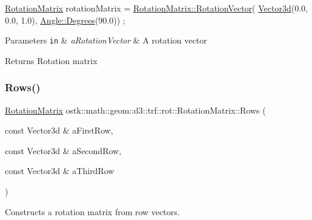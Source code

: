 \begin{DoxyCode}
\hyperlink{classostk_1_1math_1_1geom_1_1d3_1_1trf_1_1rot_1_1_rotation_matrix_a5e6bed0779ad7db0c5bf26b2bd96f8ba}{RotationMatrix} rotationMatrix = \hyperlink{classostk_1_1math_1_1geom_1_1d3_1_1trf_1_1rot_1_1_rotation_matrix_a609da1b600078c74a84bcac864aa877b}{RotationMatrix::RotationVector}(
      \hyperlink{namespaceostk_1_1math_1_1obj_a18744cbf433bce59f6758d9fe3b1dff1}{Vector3d}(0.0, 0.0, 1.0), \hyperlink{classostk_1_1math_1_1geom_1_1_angle_a2cefda601167af07f61f0477776203ca}{Angle::Degrees}(90.0)) ;
\end{DoxyCode}



\begin{DoxyParams}[1]{Parameters}
\mbox{\tt in}  & {\em a\+Rotation\+Vector} & A rotation vector \\
\hline
\end{DoxyParams}
\begin{DoxyReturn}{Returns}
Rotation matrix 
\end{DoxyReturn}
\mbox{\label{classostk_1_1math_1_1geom_1_1d3_1_1trf_1_1rot_1_1_rotation_matrix_a8316daca4e78cea8abb67611d73ac52a}} 
\subsubsection{\texorpdfstring{Rows()}{Rows()}}
{\footnotesize\ttfamily \hyperlink{classostk_1_1math_1_1geom_1_1d3_1_1trf_1_1rot_1_1_rotation_matrix}{Rotation\+Matrix} ostk\+::math\+::geom\+::d3\+::trf\+::rot\+::\+Rotation\+Matrix\+::\+Rows (\begin{DoxyParamCaption}\item[{const Vector3d \&}]{a\+First\+Row,  }\item[{const Vector3d \&}]{a\+Second\+Row,  }\item[{const Vector3d \&}]{a\+Third\+Row }\end{DoxyParamCaption})\hspace{0.3cm}{\ttfamily [static]}}



Constructs a rotation matrix from row vectors. 


